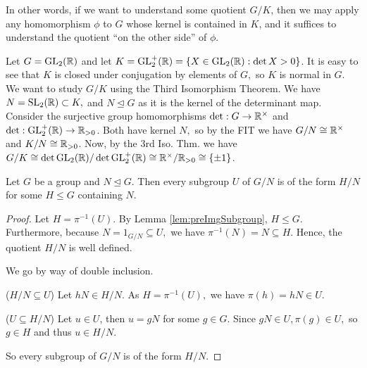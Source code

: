In other words, if we want to understand some quotient $G/K$, then we may apply any homomorphism $\phi$ to $G$ whose kernel is contained in $K$, and it suffices to understand the quotient ``on the other side'' of $\phi$.


\begin{example}
  Let $G=\operatorname{GL}_{2}(\mathbb R)$ and let $K=\operatorname{GL}_2^+(\mathbb R)=\{X\in\operatorname{GL}_2(\mathbb R) : \det X>0\}$. It is
  easy to see that $K$ is closed under conjugation by elements of $G,$ so $K$ is normal in $G$. We want to study $G/K$ using the Third Isomorphism Theorem. We have $N=\operatorname{SL}_2(\mathbb R)\subset K,$ and $N\trianglelefteq G$ as it is the kernel of the determinant map. Consider the surjective group homomorphisms
  $\det: G\to\mathbb R^{\times}$ and $\det: \operatorname{GL}_2^+(\mathbb R)\to\mathbb R_{>0}$. Both have kernel $N,$ so by the
  FIT we have $G/N\cong \mathbb R^{\times}$ and $K/N\cong \mathbb R_{>0}$. Now, by the 3rd Iso. Thm. we have
  $G/K\cong \det\operatorname{GL}_2(\mathbb R)/\det\operatorname{GL}_2^+(\mathbb R)\cong \mathbb R^{\times}/\mathbb R_{>0}\cong \{\pm 1\}$.
\end{example}


\begin{lemma}

    Let $G$ be a group and $N \unlhd G$. Then every subgroup $U$ of $G/N$ is of the form $H/N$ for some $H \leq G$ containing $N$. 
    \label{lem:subgpG/N}
\end{lemma}

\begin{proof}
     Let $H = \pi^{-1}(U)$. 
     By Lemma \ref{lem:preImgSubgroup}, $H \leq G$. Furthermore, because $N = 1_{G/N} \subseteq U,$ we have $\pi^{-1}(N)=N \subseteq H$. Hence, the quotient $H/N$ is well defined.
     

     
      We go by way of double inclusion.

    ($H/N \subseteq U$) Let $hN \in H/N$. As $H = \pi^{-1}(U),$ we have $\pi(h) = hN \in U.$

    ($U \subseteq H/N$) Let $u \in U$, then $u = gN$ for some $g \in G$.
    Since $gN \in U, \pi(g) \in U,$ so $g \in H$ and thus $u \in H/N$.

    So every subgroup of $G/N$ is of the form $H/N$.
\end{proof}

